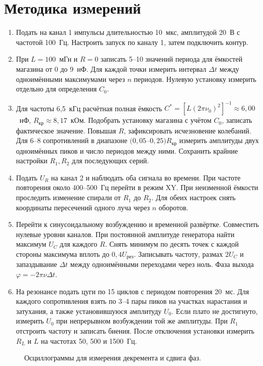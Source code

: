 \documentclass[a4paper,12pt]{article}
\begin{document}
\section{Методика измерений}
\begin{enumerate}
\item[2.1.] Подать на канал 1 импульсы длительностью 10~мкс, амплитудой 20~В с частотой 100~Гц. Настроить запуск по каналу 1, затем подключить контур.
\item[2.2.] При $L=100$~мГн и $R=0$ записать 5--10 значений периода для ёмкостей магазина от 0 до 9~нФ. Для каждой точки измерить интервал $\Delta t$ между одноимёнными максимумами через $n$ периодов. Нулевую установку измерить отдельно для определения $C_0$.
\item[2.3.] Для частоты 6,5~кГц расчётная полная ёмкость $C^*=[L(2\pi\nu_0)^2]^{-1}\approx6{,}00$~нФ, $R_{\textrm{кр}}\approx8{,}17$~кОм. Подобрать установку магазина с учётом $C_0$, записать фактическое значение. Повышая $R$, зафиксировать исчезновение колебаний. Для 6--8 сопротивлений в диапазоне $(0{,}05$--$0{,}25)R_{\textrm{кр}}$ измерить амплитуды двух одноимённых пиков и число периодов между ними. Сохранить крайние настройки $R_1,R_2$ для последующих серий.
\item[2.4.] Подать $U_R$ на канал 2 и наблюдать оба сигнала во времени. При частоте повторения около 400--500~Гц перейти в режим XY. При неизменной ёмкости проследить изменение спирали от $R_1$ до $R_2$. Для обеих настроек снять координаты пересечений одного луча через $n$ оборотов.
\item[2.5.] Перейти к синусоидальному возбуждению и временной развёртке. Совместить нулевые уровни каналов. При постоянной амплитуде генератора найти максимум $U_C$ для каждого $R$. Снять минимум по десять точек с каждой стороны максимума вплоть до $0{,}4U_{\textrm{рез}}$. Записывать частоту, размах $2U_C$ и запаздывание $\Delta t$ между одноимёнными переходами через ноль. Фаза выхода $\varphi=-2\pi\nu\Delta t$.
\item[2.6.] На резонансе подать цуги по 15 циклов с периодом повторения 20~мс. Для каждого сопротивления взять по 3--4 пары пиков на участках нарастания и затухания, а также установившуюся амплитуду $U_0$. Если плато не достигнуто, измерить $U_0$ при непрерывном возбуждении той же амплитуды. При $R_1$ отстроить частоту и записать биения. После отключения установки измерить $R_L$ и $L$ на частотах 50, 500 и 1500~Гц.
\end{enumerate}
\begin{figure}[H]\centering{}\hfill{}\caption{Осциллограммы для измерения декремента и сдвига фаз.}\end{figure}
\end{document}
